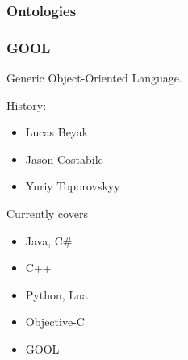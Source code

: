 \documentclass{beamer}
\begin{document}
\begin{frame}[t]
\frametitle{Ontologies}
{\large {} 
}

\end{frame}

\begin{frame}
\frametitle{GOOL}
{\Large {\color{blue}G}eneric {\color{blue}O}bject-{\color{blue}O}riented {\color{blue}L}anguage.}

History:
\begin{itemize}
\item Lucas Beyak
\item Jason Costabile
\item Yuriy Toporovskyy
\end{itemize}
\pause
Currently covers
\begin{itemize}
\item Java, C\#
\item C++
\item Python, Lua
\item Objective-C
\item GOOL
\end{itemize}
\end{frame}
\end{document}
